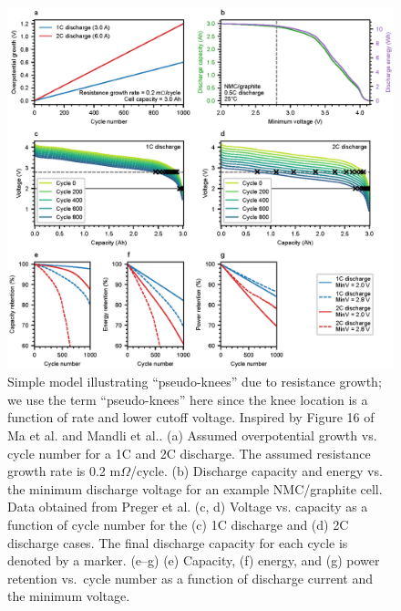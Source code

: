 \documentclass[journal=jpclcd,manuscript=article]{achemso}
\begin{document}
\begin{figure}
\centering
\includegraphics[scale = 1]{figures/resistance_growth_knee_2.eps}
\caption{Simple model illustrating ``pseudo-knees'' due to resistance growth; we use the term ``pseudo-knees'' here since the knee location is a function of rate and lower cutoff voltage. Inspired by Figure 16 of Ma et al.\cite{ma_editors_2019} and Mandli et al.\cite{mandli_analysis_2019}. (a) Assumed overpotential growth vs. cycle number for a 1C and 2C discharge. The assumed resistance growth rate is 0.2 m$\Omega$/cycle. (b) Discharge capacity and energy vs. the minimum discharge voltage for an example NMC/graphite cell. Data obtained from Preger et al.\cite{preger_degradation_2020} (c, d) Voltage vs. capacity as a function of cycle number for the (c) 1C discharge and (d) 2C discharge cases. The final discharge capacity for each cycle is denoted by a marker. (e--g) (e) Capacity, (f) energy, and (g) power retention vs.\ cycle number as a function of discharge current and the minimum voltage.
}
\label{fig:dcr_knee}
\end{figure}
\end{document}
